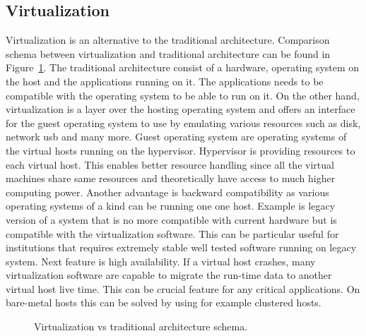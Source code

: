 \subsection{Virtualization}
\label{subsection:Virtualization}
Virtualization is an alternative to the traditional architecture. Comparison schema between virtualization and traditional architecture can be found in  Figure~\ref{fig:virtschema}. The traditional architecture consist of a hardware, operating system on the host and the applications running on it. The applications needs to be compatible with the operating system to be able to run on it. On the other hand, virtualization is a layer over the hosting operating system and offers an interface for the guest operating system to use by emulating various resources such as disk, network usb and many more. Guest operating system are operating systems of the virtual hosts running on the hypervisor. Hypervisor is providing resources to each virtual host. This enables better resource handling since all the virtual machines share same resources and theoretically have access to much higher computing power. Another advantage is backward compatibility as various operating systems of a kind can be running one one host. Example is legacy version of a system that is no more compatible with current hardware but is compatible with the virtualization software. This can be particular useful for institutions that requires extremely stable well tested software running on legacy system. Next feature is high availability. If a virtual host crashes, many virtualization software are capable to migrate the run-time data to another virtual host live time. This can be crucial feature for any critical applications. On bare-metal hosts this can be solved by using for example clustered hosts.\\

\begin{figure}[H]
	\centering
	\caption{Virtualization vs traditional architecture schema.}
	\label{fig:virtschema}
\end{figure}

